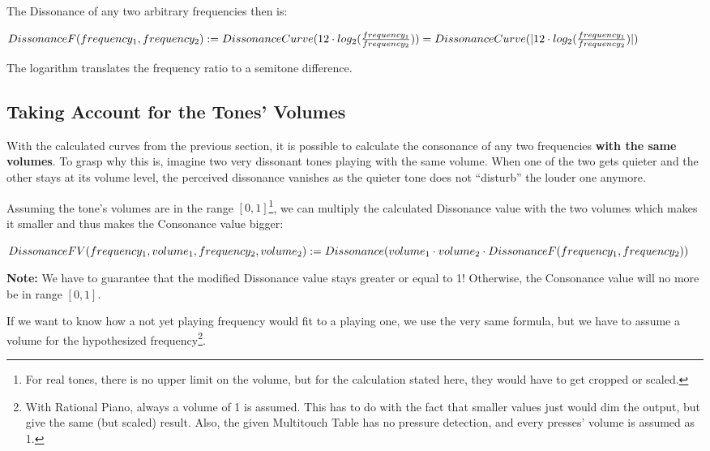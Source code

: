 \documentclass[12pt,a4paper,titlepage,oneside]{report}
\begin{document}
The Dissonance of any two arbitrary frequencies then is:

$
DissonanceF(frequency_1,frequency_2) := \\
DissonanceCurve(12 \cdot log_2(\frac{frequency_1}{frequency_2})) = \\
DissonanceCurve(| 12 \cdot log_2(\frac{frequency_1}{frequency_2}) |)
$ %

The logarithm translates the frequency ratio to a semitone difference.


\smallskip
\smallskip
\noindent
{}
\smallskip


\subsection{Taking Account for the Tones' Volumes}

With the calculated curves from the previous section, it is possible to calculate the consonance of any two frequencies \textbf{with the same volumes}. To grasp why this is, imagine two very dissonant tones playing with the same volume. When one of the two gets quieter and the other stays at its volume level, the perceived dissonance vanishes as the quieter tone does not ``disturb'' the louder one anymore.

Assuming the tone's volumes are in the range $[0,1]$\footnote{For real tones, there is no upper limit on the volume, but for the calculation stated here, they would have to get cropped or scaled.}, we can multiply the calculated Dissonance value with the two volumes which makes it smaller and thus makes the Consonance value bigger:

$
DissonanceFV(frequency_1,volume_1,frequency_2,volume_2) := \\
Dissonance(volume_1 \cdot volume_2 \cdot DissonanceF(frequency_1,frequency_2))
$ %

\textbf{Note:} We have to guarantee that the modified Dissonance value stays greater or equal to 1! Otherwise, the Consonance value will no more be in range $[0,1]$.

If we want to know how a not yet playing frequency would fit to a playing one, we use the very same formula, but we have to assume a volume for the hypothesized frequency\footnote{With Rational Piano, always a volume of 1 is assumed. This has to do with the fact that smaller values just would dim the output, but give the same (but scaled) result. Also, the given Multitouch Table has no pressure detection, and every presses' volume is assumed as 1.}.
\end{document}
